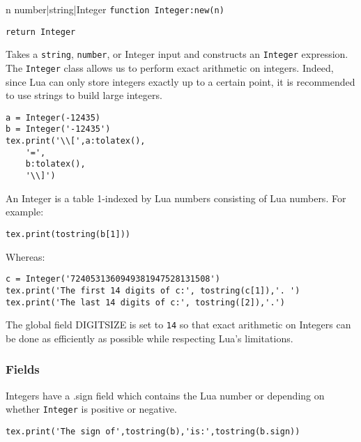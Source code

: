 \documentclass{article}
\newcommand{\newcoderef}[3]{%
\begin{newcodehead}[sidebyside,segmentation hidden]{#3}%
    \texttt{#1}%
    \tcblower%
    \begin{flushright}%
    \texttt{#2}%
    \end{flushright}%
\end{newcodehead}%
}
\begin{document}
\newcoderef{function Integer:new(n)}{return Integer}{n number|string|Integer}

Takes a \texttt{string}, \texttt{number}, or {\ttfamily Integer} input and constructs an \texttt{Integer} expression. The \texttt{Integer} class allows us to perform exact arithmetic on integers. Indeed, since Lua can only store integers exactly up to a certain point, it is recommended to use strings to build large integers.

\begin{codebox}
    \begin{verbatim}
a = Integer(-12435)
b = Integer('-12435')
tex.print('\\[',a:tolatex(),
    '=',
    b:tolatex(),
    '\\]')
\end{verbatim}
\tcblower
{}
\end{codebox}
An {\ttfamily Integer} is a table 1-indexed by Lua numbers consisting of Lua numbers. For example:
\begin{codebox}
    \begin{verbatim}
tex.print(tostring(b[1]))
\end{verbatim}
\tcblower
{}
\end{codebox}
Whereas:
\begin{codebox}[]
    \begin{verbatim}
c = Integer('7240531360949381947528131508')
tex.print('The first 14 digits of c:', tostring(c[1]),'. ')
tex.print('The last 14 digits of c:', tostring([2]),'.')
\end{verbatim}
\tcblower
{}
\end{codebox}

The global field {\ttfamily DIGITSIZE} is set to \texttt{14} so that exact arithmetic on {\ttfamily Integer}s can be done as efficiently as possible while respecting Lua's limitations.

\subsubsection*{Fields}
{\ttfamily Integer}s have a {\ttfamily .sign} field which contains the Lua number {} or {} depending on whether \texttt{Integer} is positive or negative. 
\begin{codebox}[]
    \begin{verbatim}
tex.print('The sign of',tostring(b),'is:',tostring(b.sign))
\end{verbatim}
\tcblower
{}
\end{codebox}
\end{document}
